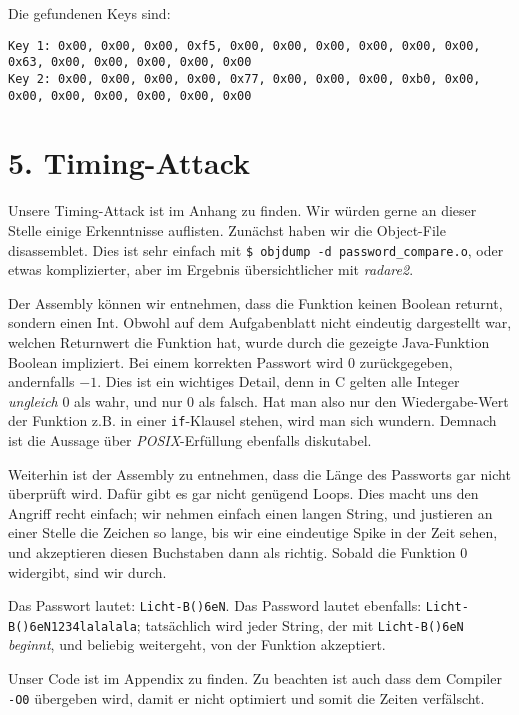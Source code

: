 \documentclass[10pt,a4paper]{article}
\begin{document}
Die gefundenen Keys sind:
\begin{verbatim}
Key 1: 0x00, 0x00, 0x00, 0xf5, 0x00, 0x00, 0x00, 0x00, 0x00, 0x00, 0x63, 0x00, 0x00, 0x00, 0x00, 0x00
Key 2: 0x00, 0x00, 0x00, 0x00, 0x77, 0x00, 0x00, 0x00, 0xb0, 0x00, 0x00, 0x00, 0x00, 0x00, 0x00, 0x00
\end{verbatim}

\setcounter{section}{5}
\section*{5. Timing-Attack}
\setcounter{subsection}{0}

Unsere Timing-Attack ist im Anhang zu finden. Wir würden gerne an dieser Stelle einige Erkenntnisse auflisten.
Zunächst haben wir die Object-File disassemblet. Dies ist sehr einfach mit \texttt{\$ objdump -d password\_compare.o},
oder etwas komplizierter, aber im Ergebnis übersichtlicher mit \textit{radare2}.

Der Assembly können wir entnehmen, dass die Funktion keinen Boolean returnt, sondern einen Int. Obwohl auf dem
Aufgabenblatt nicht eindeutig dargestellt war, welchen Returnwert die Funktion hat, wurde durch die gezeigte
Java-Funktion Boolean impliziert. Bei einem korrekten Passwort wird $0$ zurückgegeben, andernfalls $-1$.
Dies ist ein wichtiges Detail, denn in C gelten alle Integer \textit{ungleich} $0$ als wahr, und nur $0$ als falsch.
Hat man also nur den Wiedergabe-Wert der Funktion z.B. in einer \texttt{if}-Klausel stehen, wird man sich wundern.
Demnach ist die Aussage über \textit{POSIX}-Erfüllung ebenfalls diskutabel.

Weiterhin ist der Assembly zu entnehmen, dass die Länge des Passworts gar nicht überprüft wird. Dafür gibt es gar nicht genügend
Loops. Dies macht uns den Angriff recht einfach; wir nehmen einfach einen langen String, und justieren an einer Stelle
die Zeichen so lange, bis wir eine eindeutige Spike in der Zeit sehen, und akzeptieren diesen Buchstaben dann als richtig.
Sobald die Funktion $0$ widergibt, sind wir durch.

Das Passwort lautet: \texttt{Licht-B()6eN}. Das Password lautet ebenfalls: \texttt{Licht-B()6eN1234lalalala};
tatsächlich wird jeder String, der mit \texttt{Licht-B()6eN} \textit{beginnt}, und beliebig weitergeht, von der Funktion akzeptiert.

Unser Code ist im Appendix zu finden. Zu beachten ist auch dass dem Compiler \texttt{-O0} übergeben wird,
damit er nicht optimiert und somit die Zeiten verfälscht.
\end{document}
